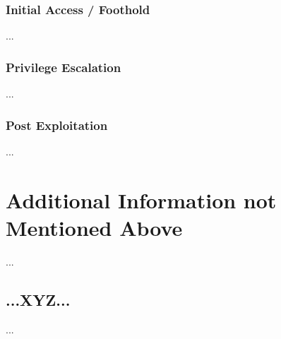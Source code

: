 \subsubsection{Initial Access / Foothold}\label{sec:sec5-dc1-init}
%
...
%
%
%
\subsubsection{Privilege Escalation}\label{sec:sec5-dc1-priv}
%
...
%
%
%
\subsubsection{Post Exploitation}\label{sec:sec5-dc1-post}
%
...
%
%
%
\section{Additional Information not Mentioned Above}\label{sec:last}
%
...
%
%
%
\subsection{...XYZ...}\label{sec:last-xyz}
%
...
%
%
%


